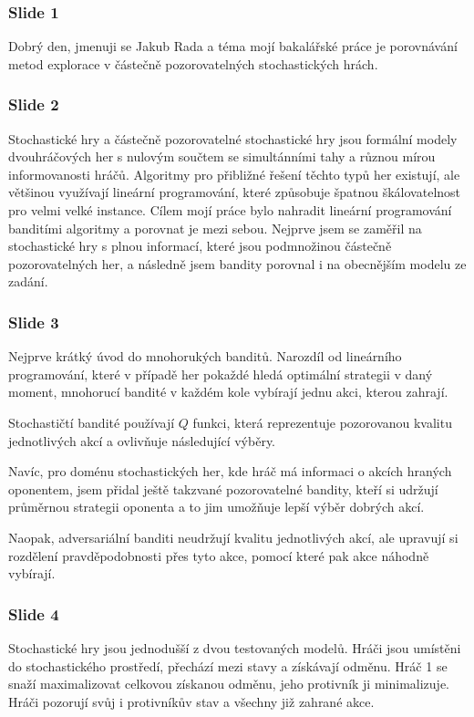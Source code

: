 \documentclass[11pt]{article}
\begin{document}
\subsubsection*{Slide 1}
Dobrý den, jmenuji se Jakub Rada a téma mojí bakalářské práce je porovnávání metod explorace v částečně pozorovatelných stochastických hrách.

\subsubsection*{Slide 2}
Stochastické hry a částečně pozorovatelné stochastické hry jsou formální modely dvouhráčových her s nulovým součtem se simultánními tahy a různou mírou informovanosti hráčů.
Algoritmy pro přibližné řešení těchto typů her existují, ale většinou využívají lineární programování, které způsobuje špatnou škálovatelnost pro velmi velké instance.
Cílem mojí práce bylo nahradit lineární programování banditími algoritmy a porovnat je mezi sebou.
Nejprve jsem se zaměřil na stochastické hry s plnou informací, které jsou podmnožinou částečně pozorovatelných her, a následně jsem bandity porovnal i na obecnějším modelu ze zadání.

\subsubsection*{Slide 3}
Nejprve krátký úvod do mnohorukých banditů.
Narozdíl od lineárního programování, které v případě her pokaždé hledá optimální strategii v daný moment, mnohorucí bandité v každém kole vybírají jednu akci, kterou zahrají.

Stochastičtí bandité používají $Q$ funkci, která reprezentuje pozorovanou kvalitu jednotlivých akcí a ovlivňuje následující výběry.

Navíc, pro doménu stochastických her, kde hráč má informaci o akcích hraných oponentem, jsem přidal ještě takzvané pozorovatelné bandity, kteří si udržují průměrnou strategii oponenta a to jim umožňuje lepší výběr dobrých akcí.

Naopak, adversariální banditi neudržují kvalitu jednotlivých akcí, ale upravují si rozdělení pravděpodobnosti přes tyto akce, pomocí které pak akce náhodně vybírají.

\subsubsection*{Slide 4}
Stochastické hry jsou jednodušší z dvou testovaných modelů.
Hráči jsou umístěni do stochastického prostředí, přechází mezi stavy a získávají odměnu.
Hráč 1 se snaží maximalizovat celkovou získanou odměnu, jeho protivník ji minimalizuje.
Hráči pozorují svůj i protivníkův stav a všechny již zahrané akce.
\end{document}
